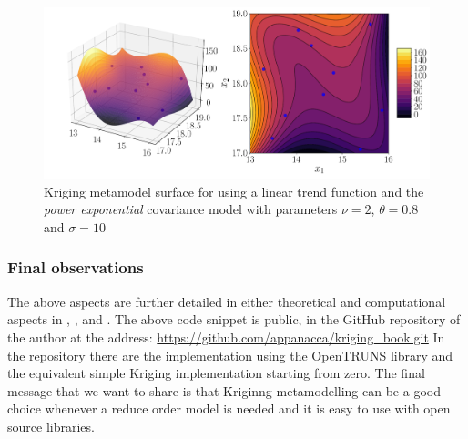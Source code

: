 \begin{figure}[h]
	\centering
	\includegraphics[width=0.9\linewidth]{appendix_a/kriging_openturns3}
	\caption{Kriging metamodel surface for using a linear trend function and the \textit{power exponential} covariance model with parameters $\nu=2$, $\theta=0.8$ and $\sigma=10$}
	\label{fig:kriging_openturns3}
\end{figure}


\subsubsection{Final observations}

The above aspects are further detailed in either theoretical and computational aspects in \citet{cavazzuti2012optimization}, \citet{dakota}, \citet{sacks1989design} and \citet{openturns}.
The above code snippet is public, in the GitHub repository of the author at the address: \url{https://github.com/appanacca/kriging_book.git}
In the repository there are the implementation using the OpenTRUNS library and the equivalent simple Kriging implementation starting from zero.
The final message that we want to share is that Kriginng metamodelling can be a good choice whenever a reduce order model is needed and it is easy to use with open source libraries.
